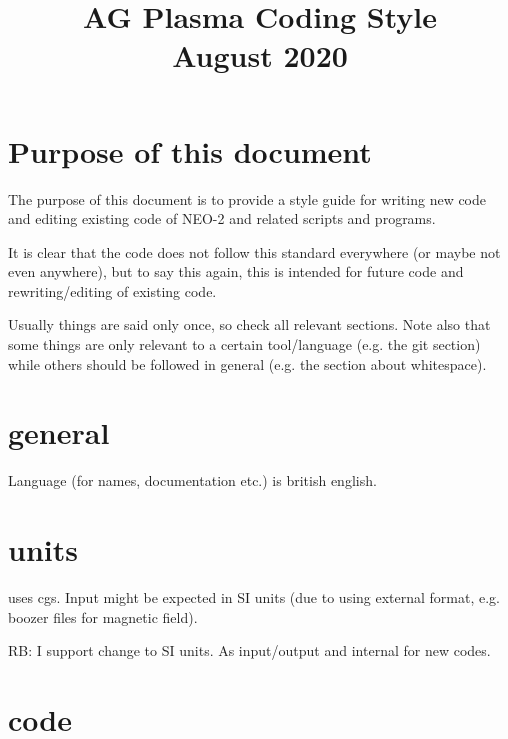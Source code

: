 \documentclass{article}
\title{\textbf{AG Plasma Coding Style\\August 2020}}
\begin{document}
\maketitle

\section{Purpose of this document}
The purpose of this document is to provide a style guide for writing new
code and editing existing code of NEO-2 and related scripts and
programs.

It is clear that the code does not follow this standard everywhere (or
maybe not even anywhere), but to say this again, this is intended for
future code and rewriting/editing of existing code.

Usually things are said only once, so check all relevant sections.
Note also that some things are only relevant to a certain tool/language
(e.g. the git section) while others should be followed in general (e.g.
the section about whitespace).

\section{general}
Language (for names, documentation etc.) is british english.

\section{units}
\neotwo uses cgs. Input might be expected in SI units (due
to using external format, e.g. boozer files for magnetic field).

RB: I support change to SI units. As input/output and internal for new
codes.

\section{code}
\end{document}
